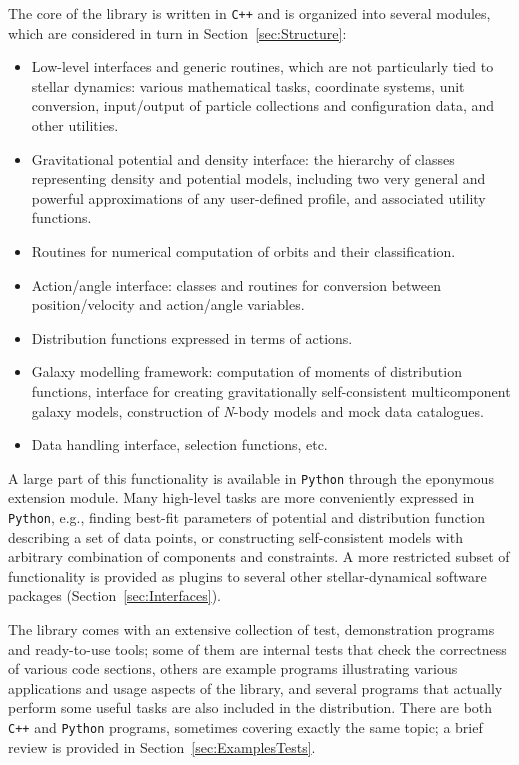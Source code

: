 \documentclass[12pt]{article}
\newcommand{\Nbody}{\textsl{N}-body\xspace}
\newcommand{\Cpp}  {\texttt{C++}\xspace}
\newcommand{\Python}{\texttt{Python}\xspace}
\begin{document}
The core of the library is written in \Cpp and is organized into several modules, which are considered in turn in Section~\ref{sec:Structure}:
\begin{itemize}  \setlength{\parskip}{2pt} \setlength{\itemsep}{2pt}
\item Low-level interfaces and generic routines, which are not particularly tied to stellar dynamics: various mathematical tasks, coordinate systems, unit conversion, input/output of particle collections and configuration data, and other utilities.
\item Gravitational potential and density interface: the hierarchy of classes representing density and potential models, including two very general and powerful approximations of any user-defined profile, and associated utility functions.
\item Routines for numerical computation of orbits and their classification.
\item Action/angle interface: classes and routines for conversion between position/velocity and action/angle variables.
\item Distribution functions expressed in terms of actions.
\item Galaxy modelling framework: computation of moments of distribution functions, interface for creating gravitationally self-consistent multicomponent galaxy models, construction of \Nbody models and mock data catalogues.
\item Data handling interface, selection functions, etc.
\end{itemize}

A large part of this functionality is available in \Python through the eponymous extension module. Many high-level tasks are more conveniently expressed in \Python, e.g., finding best-fit parameters of potential and distribution function describing a set of data points, or constructing self-consistent models with arbitrary combination of components and constraints.
A more restricted subset of functionality is provided as plugins to several other stellar-dynamical software packages (Section~\ref{sec:Interfaces}).

The library comes with an extensive collection of test, demonstration programs and ready-to-use tools; some of them are internal tests that check the correctness of various code sections, others are example programs illustrating various applications and usage aspects of the library, and several programs that actually perform some useful tasks are also included in the distribution. There are both \Cpp and \Python programs, sometimes covering exactly the same topic; a brief review is provided in Section~\ref{sec:ExamplesTests}.
\end{document}
